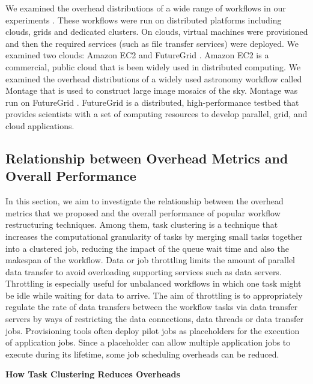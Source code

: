 We examined the overhead distributions of a wide range of workflows in our experiments . These workflows were run on distributed platforms including clouds, grids and dedicated clusters. 
On clouds, virtual machines were provisioned and then the required services (such as file transfer services) were deployed. 
We examined two clouds: Amazon EC2 \cite{AmazonEC2}  and FutureGrid \cite{FutureGrid}. Amazon EC2 is a commercial, public cloud that is been widely used in distributed computing. 
We examined the overhead distributions of a widely used astronomy workflow called Montage \cite{Berriman2004} that is used to construct large image mosaics of the sky. Montage was run on FutureGrid \cite{FutureGrid}. FutureGrid is a distributed, high-performance testbed that provides scientists with a set of computing resources to develop parallel, grid, and cloud applications. 
\subsection{Relationship between Overhead Metrics and Overall Performance}

In this section, we aim to investigate the relationship between the overhead metrics that we proposed and the overall performance of popular workflow restructuring techniques. Among them, task clustering \cite{Singh2008} is a technique that increases the computational granularity of tasks by merging small tasks together into a clustered job, reducing the impact of the queue wait time and also the makespan of the workflow. Data or job throttling \cite{Humphrey2008} limits the amount of parallel data transfer to avoid overloading supporting services such as data servers. Throttling is especially useful for unbalanced workflows in which one task might be idle while waiting for data to arrive. The aim of throttling is to appropriately regulate the rate of data transfers between the workflow tasks via data transfer servers by ways of restricting the data connections, data threads or data transfer jobs. Provisioning tools often deploy pilot jobs as placeholders for the execution of application jobs. Since a placeholder can allow multiple application jobs to execute during its lifetime, some job scheduling overheads can be reduced. 

\textbf{How Task Clustering Reduces Overheads}

